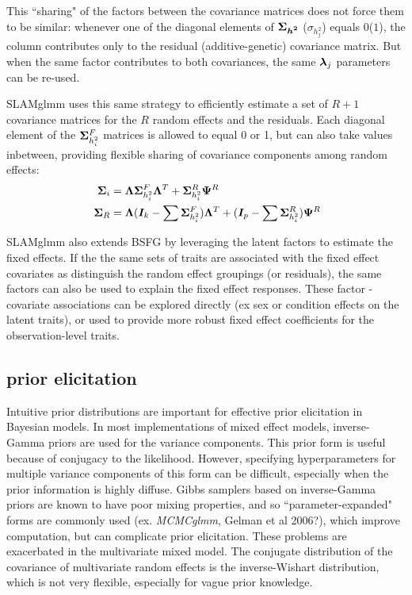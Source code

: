 \documentclass[11pt]{amsart}
\newcommand*{\B}[1]{\ifmmode\bm{#1}\else\textbf{#1}\fi}
\begin{document}
This ``sharing" of the factors between the covariance matrices does not force them to be similar: whenever one of the diagonal elements of $\B{\Sigma_{h^2}}$ ($\sigma_{h^2_j}$) equals $0$($1$), the column contributes only to the residual (additive-genetic) covariance matrix. But when the same factor contributes to both covariances, the same $\B{\lambda}_j$ parameters can be re-used.

SLAMglmm uses this same strategy to efficiently estimate a set of $R+1$ covariance matrices for the $R$ random effects and the residuals. Each diagonal element of the $\B{\Sigma}^F_{h^2_i}$ matrices is allowed to equal 0 or 1, but can also take values inbetween, providing flexible sharing of covariance components among random effects:
\begin{align}\begin{split}
\;\B{\Sigma}_i &= \B{\Lambda} \B{\Sigma}^F_{h^2_i} \B{\Lambda}^T + \B{\Sigma}^R_{h^2_i}\B{\Psi}^R \\
\;\B{\Sigma}_R &= \B{\Lambda} (\B{I}_k - \sum \B{\Sigma}^F_{h^2_i}) \B{\Lambda}^T + (\B{I}_p - \sum \B{\Sigma}^R_{h^2_i})\B{\Psi}^R 
\end{split} \end{align}

SLAMglmm also extends BSFG by leveraging the latent factors to estimate the fixed effects. If the the same sets of traits are associated with the fixed effect covariates as distinguish the random effect groupings (or residuals), the same factors can also be used to explain the fixed effect responses. These factor - covariate associations can be explored directly (ex sex or condition effects on the latent traits), or used to provide more robust fixed effect coefficients for the observation-level traits.

\subsection{prior elicitation}
\label{random_effect_priors}
Intuitive prior distributions are important for effective prior elicitation in Bayesian models. In most implementations of mixed effect models, inverse-Gamma priors are used for the variance components. This prior form is useful because of conjugacy to the likelihood. However, specifying hyperparameters for multiple variance components of this form can be difficult, especially when the prior information is highly diffuse. Gibbs samplers based on inverse-Gamma priors are known to have poor mixing properties, and so ``parameter-expanded" forms are commonly used (ex. \emph{MCMCglmm}, Gelman et al 2006?), which improve computation, but can complicate prior elicitation. These problems are exacerbated in the multivariate mixed model. The conjugate distribution of the covariance of multivariate random effects is the inverse-Wishart distribution, which is not very flexible, especially for vague prior knowledge.
\end{document}
